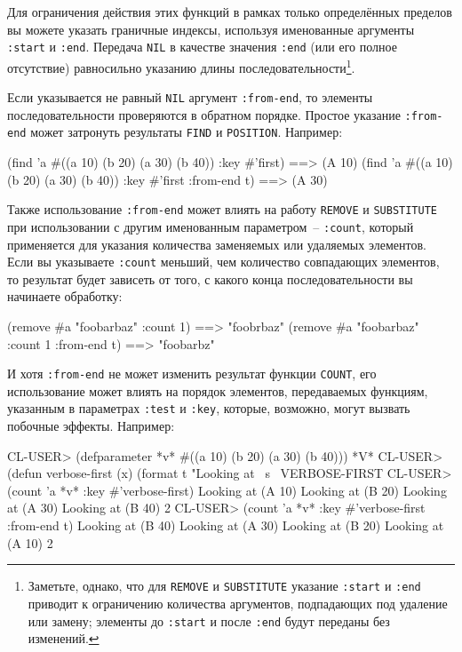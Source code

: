 Для ограничения действия этих функций в рамках только определённых пределов вы можете
указать граничные индексы, используя именованные аргументы \lstinline{:start} и \lstinline{:end}.
Передача \lstinline{NIL} в качестве значения \lstinline{:end} (или его полное отсутствие)
равносильно указанию длины последовательности\footnote{Заметьте, однако, что для
  \lstinline{REMOVE} и \lstinline{SUBSTITUTE} указание \lstinline{:start} и \lstinline{:end} приводит к
  ограничению количества аргументов, подпадающих под удаление или замену; элементы до
  \lstinline{:start} и после \lstinline{:end} будут переданы без изменений.}.

Если указывается не равный \lstinline{NIL} аргумент \lstinline{:from-end}, то элементы
последовательности проверяются в обратном порядке.  Простое указание \lstinline{:from-end}
может затронуть результаты \lstinline{FIND} и \lstinline{POSITION}.  Например:

\begin{myverb}
  (find 'a #((a 10) (b 20) (a 30) (b 40)) :key #'first)             ==> (A 10)
  (find 'a #((a 10) (b 20) (a 30) (b 40)) :key #'first :from-end t) ==> (A 30)
\end{myverb}

Также использование \lstinline{:from-end} может влиять на работу \lstinline{REMOVE} и
\lstinline{SUBSTITUTE} при использовании с другим именованным параметром~-- \lstinline{:count},
который применяется для указания количества заменяемых или удаляемых элементов.  Если вы
указываете \lstinline{:count} меньший, чем количество совпадающих элементов, то результат будет
зависеть от того, с какого конца последовательности вы начинаете обработку:

\begin{myverb}
  (remove #\bslash{}a "foobarbaz" :count 1)             ==> "foobrbaz"
  (remove #\bslash{}a "foobarbaz" :count 1 :from-end t) ==> "foobarbz"
\end{myverb}

И хотя \lstinline{:from-end} не может изменить результат функции \lstinline{COUNT}, его
использование может влиять на порядок элементов, передаваемых функциям, указанным в
параметрах \lstinline{:test} и \lstinline{:key}, которые, возможно, могут вызвать побочные эффекты.
Например:

\begin{myverb}
  CL-USER> (defparameter *v* #((a 10) (b 20) (a 30) (b 40)))
  *V*
  CL-USER> (defun verbose-first (x) (format t "Looking at ~s~%
  VERBOSE-FIRST
  CL-USER> (count 'a *v* :key #'verbose-first)
  Looking at (A 10)
  Looking at (B 20)
  Looking at (A 30)
  Looking at (B 40)
  2
  CL-USER> (count 'a *v* :key #'verbose-first :from-end t)
  Looking at (B 40)
  Looking at (A 30)
  Looking at (B 20)
  Looking at (A 10)
  2
\end{myverb}

